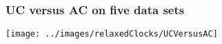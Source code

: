 \begin{frame}
\frametitle{UC versus AC on five data sets}

\begin{centering}

\texttt{[image: ../images/relaxedClocks/UCVersusAC]}

\end{centering}

\end{frame}